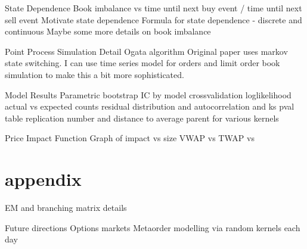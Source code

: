 \documentclass[usenames,dvipsnames,handout]{beamer}
\begin{document}
\begin{frame}{State Dependence}
	Book imbalance vs time until next buy event / time until next sell event
	Motivate state dependence
	Formula for state dependence - discrete and continuous
	Maybe some more details on book imbalance
\end{frame}

\begin{frame}{Point Process Simulation}
	Detail Ogata algorithm
	Original paper uses markov state switching. I can use time series model for orders and limit order book simulation to make this a bit more sophisticated.
\end{frame}

\begin{frame}{Model Results}
	Parametric bootstrap
	IC by model
	crossvalidation loglikelihood
	actual vs expected counts
	residual distribution and autocorrelation and ks pval table
	replication number and distance to average parent for various kernels
\end{frame}

\begin{frame}{Price Impact Function}
	Graph of impact vs size
	VWAP vs TWAP vs 
\end{frame}

\section{appendix}

\begin{frame}{EM and branching matrix details}
\end{frame}

\begin{frame}{Future directions}
	Options markets
	Metaorder modelling via random kernels each day
\end{frame}
\end{document}
